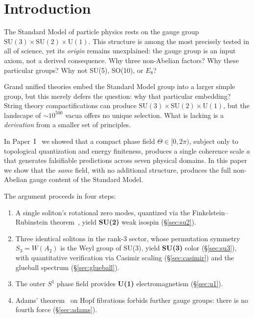 \documentclass[a4paper,12pt]{article}
\begin{document}
\section{Introduction}
\label{sec:intro}

The Standard Model of particle physics rests on the gauge group
$\mathrm{SU}(3) \times \mathrm{SU}(2) \times \mathrm{U}(1)$.
This structure is among the most precisely tested in all of science,
yet its \emph{origin} remains unexplained: the gauge group is an
input axiom, not a derived consequence. Why three non-Abelian
factors? Why these particular groups? Why not SU(5), SO(10), or
$E_8$?

Grand unified theories embed the Standard Model group into a larger
simple group, but this merely defers the question: why that particular
embedding? String theory compactifications can produce
$\mathrm{SU}(3) \times \mathrm{SU}(2) \times \mathrm{U}(1)$, but
the landscape of $\sim\!10^{500}$ vacua offers no unique selection.
What is lacking is a \emph{derivation} from a smaller set of
principles.

In Paper~I~\cite{PaperI} we showed that a compact phase field
$\Theta \in [0,2\pi)$, subject only to topological quantization and
energy finiteness, produces a single coherence scale $a$ that
generates falsifiable predictions across seven physical domains.
In this paper we show that the \emph{same} field, with no additional
structure, produces the full non-Abelian gauge content of the
Standard Model.

The argument proceeds in four steps:
\begin{enumerate}
 \item A single soliton's rotational zero modes, quantized via the
 Finkelstein--Rubinstein theorem~\cite{FR1968}, yield
 \textbf{SU(2)} weak isospin (§\ref{sec:su2}).
 \item Three identical solitons in the rank-3 sector, whose
 permutation symmetry $S_3 = W(A_2)$ is the Weyl group of SU(3),
 yield \textbf{SU(3)} color (§\ref{sec:su3}), with quantitative
 verification via Casimir scaling (§\ref{sec:casimir}) and the
 glueball spectrum (§\ref{sec:glueball}).
 \item The outer $S^1$ phase field provides \textbf{U(1)}
 electromagnetism (§\ref{sec:u1}).
 \item Adams' theorem~\cite{Adams1960} on Hopf fibrations forbids
 further gauge groups: there is no fourth force (§\ref{sec:adams}).
\end{enumerate}
\end{document}
